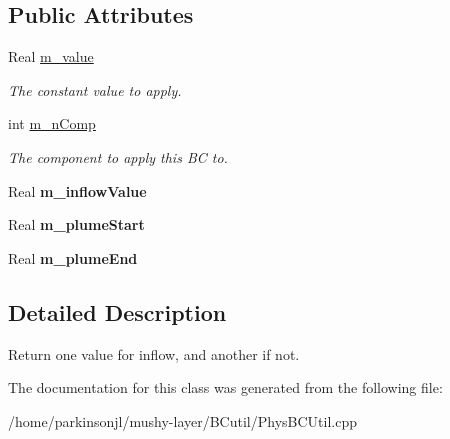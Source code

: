 \subsection*{Public Attributes}
\begin{DoxyCompactItemize}
\item 
\hypertarget{class_inflow_value_function_a5a02392c298428969a7d750bbb111e80}{Real \hyperlink{class_inflow_value_function_a5a02392c298428969a7d750bbb111e80}{m\-\_\-value}}\label{class_inflow_value_function_a5a02392c298428969a7d750bbb111e80}

\begin{DoxyCompactList}\small\item\em The constant value to apply. \end{DoxyCompactList}\item 
\hypertarget{class_inflow_value_function_a5d9645cce1fdb3972fc7e2ae2b644b98}{int \hyperlink{class_inflow_value_function_a5d9645cce1fdb3972fc7e2ae2b644b98}{m\-\_\-n\-Comp}}\label{class_inflow_value_function_a5d9645cce1fdb3972fc7e2ae2b644b98}

\begin{DoxyCompactList}\small\item\em The component to apply this B\-C to. \end{DoxyCompactList}\item 
\hypertarget{class_inflow_value_function_a46bcf5848d66c489ac517d55259bfe44}{Real {\bfseries m\-\_\-inflow\-Value}}\label{class_inflow_value_function_a46bcf5848d66c489ac517d55259bfe44}

\item 
\hypertarget{class_inflow_value_function_a3e3686426aac78ec5aed2098e87f744c}{Real {\bfseries m\-\_\-plume\-Start}}\label{class_inflow_value_function_a3e3686426aac78ec5aed2098e87f744c}

\item 
\hypertarget{class_inflow_value_function_aa8f3be53977376cea300461c24e67e00}{Real {\bfseries m\-\_\-plume\-End}}\label{class_inflow_value_function_aa8f3be53977376cea300461c24e67e00}

\end{DoxyCompactItemize}


\subsection{Detailed Description}
Return one value for inflow, and another if not. 

The documentation for this class was generated from the following file\-:\begin{DoxyCompactItemize}
\item 
/home/parkinsonjl/mushy-\/layer/\-B\-Cutil/Phys\-B\-C\-Util.\-cpp\end{DoxyCompactItemize}
